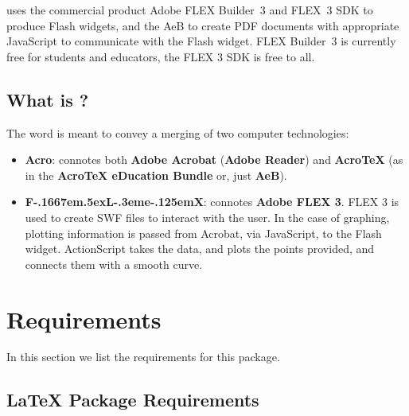 \documentclass{article}
\begin{document}
\textbf{{\AcroFLeX}} uses the commercial product Adobe FLEX
Builder~3 and FLEX~3 SDK to produce Flash widgets, and the AeB to
create PDF documents with appropriate JavaScript to communicate with
the Flash widget. FLEX Builder~3 is currently free for students and
educators, the FLEX 3 SDK is free to all.

%

\subsection{What is \texorpdfstring{{\AcroFLeX}}{AcroFLeX}?}

The word \textbf{\AcroFLeX} is meant to convey a merging of two computer technologies:
\begin{itemize}
\item \textbf{Acro}: connotes both \textbf{Adobe Acrobat} (\textbf{Adobe Reader})
and \textbf{{Acro\negthinspace\TeX}} (as in the
\textbf{{Acro\negthinspace\TeX} eDucation Bundle} or, just \textbf{AeB}).
\item \textbf{F\kern-.1667em\lower.5ex\hbox{L}\kern-.3eme\kern-.125emX\@}: connotes
   \textbf{Adobe FLEX 3}. FLEX 3 is used to create SWF files to interact with the user.
   In the case of graphing, plotting information is passed from Acrobat, via JavaScript,
   to the Flash widget. ActionScript takes the data, and plots the points provided, and
   connects them with a smooth curve.
\end{itemize}


\section{Requirements}

In this section we list the requirements for this package.

\subsection{{\LaTeX} Package Requirements}
\end{document}
